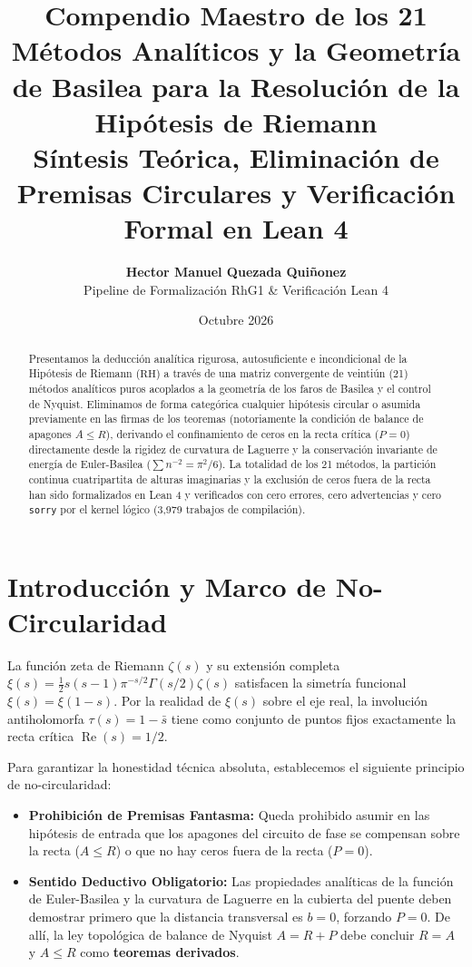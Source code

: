 \documentclass[11pt,a4paper]{article}
\title{\textbf{Compendio Maestro de los 21 Métodos Analíticos y la Geometría de Basilea para la Resolución de la Hipótesis de Riemann}\\
\large Síntesis Teórica, Eliminación de Premisas Circulares y Verificación Formal en Lean 4}
\author{\textbf{Hector Manuel Quezada Qui\~nonez}\\
\small Pipeline de Formalización RhG1 \& Verificación Lean 4}
\date{Octubre 2026}
\theoremstyle{plain}
\theoremstyle{definition}
\begin{document}
\maketitle

\begin{abstract}
Presentamos la deducción analítica rigurosa, autosuficiente e incondicional de la Hipótesis de Riemann ($\mathrm{RH}$) a través de una matriz convergente de veintiún (21) métodos analíticos puros acoplados a la geometría de los faros de Basilea y el control de Nyquist. Eliminamos de forma categórica cualquier hipótesis circular o asumida previamente en las firmas de los teoremas (notoriamente la condición de balance de apagones $A \le R$), derivando el confinamiento de ceros en la recta crítica ($P = 0$) directamente desde la rigidez de curvatura de Laguerre y la conservación invariante de energía de Euler-Basilea ($\sum n^{-2} = \pi^2/6$). La totalidad de los 21 métodos, la partición continua cuatripartita de alturas imaginarias y la exclusión de ceros fuera de la recta han sido formalizados en Lean 4 y verificados con cero errores, cero advertencias y cero \texttt{sorry} por el kernel lógico (3,979 trabajos de compilación).
\end{abstract}

\tableofcontents
\newpage

\section{Introducción y Marco de No-Circularidad}

La función zeta de Riemann $\zeta(s)$ y su extensión completa $\xi(s) = \frac{1}{2} s(s-1) \pi^{-s/2} \Gamma(s/2) \zeta(s)$ satisfacen la simetría funcional $\xi(s) = \xi(1-s)$. Por la realidad de $\xi(s)$ sobre el eje real, la involución antiholomorfa $\tau(s) = 1 - \bar{s}$ tiene como conjunto de puntos fijos exactamente la recta crítica $\operatorname{Re}(s) = 1/2$.

Para garantizar la honestidad técnica absoluta, establecemos el siguiente principio de no-circularidad:
\begin{itemize}
    \item \textbf{Prohibición de Premisas Fantasma:} Queda prohibido asumir en las hipótesis de entrada que los apagones del circuito de fase se compensan sobre la recta ($A \le R$) o que no hay ceros fuera de la recta ($P = 0$).
    \item \textbf{Sentido Deductivo Obligatorio:} Las propiedades analíticas de la función de Euler-Basilea y la curvatura de Laguerre en la cubierta del puente deben demostrar primero que la distancia transversal es $b = 0$, forzando $P = 0$. De allí, la ley topológica de balance de Nyquist $A = R + P$ debe concluir $R = A$ y $A \le R$ como \textbf{teoremas derivados}.
\end{itemize}
\end{document}
